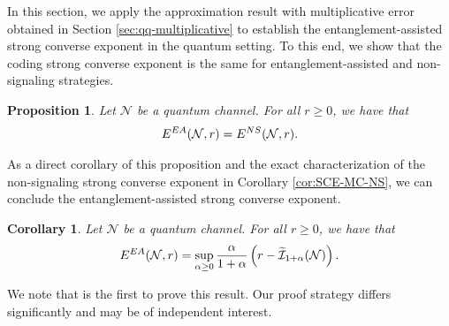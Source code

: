 \documentclass[a4paper,onecolumn,11pt,accepted=2025-10-01]{quantumarticle}
\newtheorem{prop}[theorem]{Proposition}
\newtheorem{cor}[theorem]{Corollary}
\newcommand*{\cI}{\mathcal{I}}
\newcommand*{\cN}{\mathcal{N}}
\begin{document}
In this section, we apply the approximation result with multiplicative error obtained in Section \ref{sec:qq-multiplicative} to establish the entanglement-assisted strong converse exponent in the quantum setting. 
To this end, we show that the coding strong converse exponent is the same for entanglement-assisted and non-signaling strategies.
\begin{prop}\label{prop:qq-EE-EA-NS}
    Let $\cN$ be a quantum channel. For all $r\ge 0$, we have  that
    \begin{align}
   E^{\rm{EA}}(\cN, r) = E^{\rm{NS}}(\cN, r).
\end{align}
\end{prop}
As a direct corollary of this proposition and the exact characterization of the non-signaling strong converse exponent in Corollary \ref{cor:SCE-MC-NS}, we can conclude the entanglement-assisted strong converse exponent.

\begin{cor}\label{cor:SCE-EA-NS}
    Let  $\cN$ be a quantum channel. For all $r\ge 0$, we have  that
 \begin{align}
     E^{\rm{EA}}(\cN, r) =  \sup_{\alpha\ge 0}  \frac{\alpha}{1+\alpha}\left( r- \widetilde{\cI}_{1+\alpha}(\cN) \right). 
    \end{align}
\end{cor}

We note that \cite{Li2023Nov} is the first to prove this result. Our proof strategy differs significantly and may be of independent interest.
\end{document}

